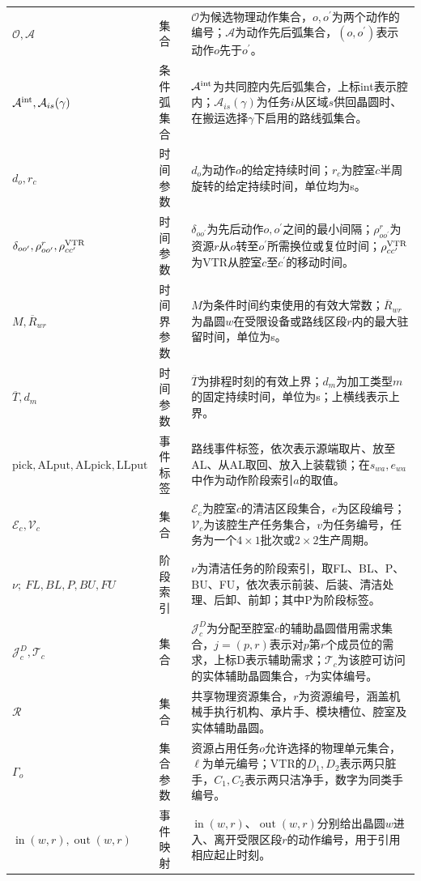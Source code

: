\documentclass[final,5p,times,twocolumn]{elsarticle}
\begin{document}
\begin{table}[t]
\begin{tabular}{C{0.23\textwidth}C{0.10\textwidth}C{0.61\textwidth}}
$\mathcal O,\mathcal A$ & 集合 & $\mathcal O$为候选物理动作集合，$o,o^{\prime}$为两个动作的编号；$\mathcal A$为动作先后弧集合，$(o,o^{\prime})$表示动作$o$先于$o^{\prime}$。\\
$\mathcal A^{\rm int},\mathcal A_{is}(\gamma)$ & 条件弧集合 & $\mathcal A^{\rm int}$为共同腔内先后弧集合，上标int表示腔内；$\mathcal A_{is}(\gamma)$为任务$i$从区域$s$供回晶圆时、在搬运选择$\gamma$下启用的路线弧集合。\\
$d_o,r_c$ & 时间参数 & $d_o$为动作$o$的给定持续时间；$r_c$为腔室$c$半周旋转的给定持续时间，单位均为s。\\
$\delta_{oo'},\rho^r_{oo'},\rho^{\rm VTR}_{cc'}$ & 时间参数 & $\delta_{oo^{\prime}}$为先后动作$o,o^{\prime}$之间的最小间隔；$\rho^r_{oo^{\prime}}$为资源$r$从$o$转至$o^{\prime}$所需换位或复位时间；$\rho^{\rm VTR}_{cc^{\prime}}$为VTR从腔室$c$至$c^{\prime}$的移动时间。\\
$M,\overline R_{wr}$ & 时间界参数 & $M$为条件时间约束使用的有效大常数；$\overline R_{wr}$为晶圆$w$在受限设备或路线区段$r$内的最大驻留时间，单位为s。\\
$\overline T,d_m$ & 时间参数 & $\overline T$为排程时刻的有效上界；$d_m$为加工类型$m$的固定持续时间，单位为s；上横线表示上界。\\
$\mathrm{pick,ALput,ALpick,LLput}$ & 事件标签 & 路线事件标签，依次表示源端取片、放至AL、从AL取回、放入上装载锁；在$s_{wa},e_{wa}$中作为动作阶段索引$a$的取值。\\
$\mathcal E_c,\mathcal V_c$ & 集合 & $\mathcal E_c$为腔室$c$的清洁区段集合，$e$为区段编号；$\mathcal V_c$为该腔生产任务集合，$v$为任务编号，任务为一个$4\times1$批次或$2\times2$生产周期。\\
$\nu;\ FL,BL,P,BU,FU$ & 阶段索引 & $\nu$为清洁任务的阶段索引，取FL、BL、P、BU、FU，依次表示前装、后装、清洁处理、后卸、前卸；其中P为阶段标签。\\
$\mathcal J_c^D,\mathcal T_c$ & 集合 & $\mathcal J_c^D$为分配至腔室$c$的辅助晶圆借用需求集合，$j=(p,r)$表示对$p$第$r$个成员位的需求，上标D表示辅助需求；$\mathcal T_c$为该腔可访问的实体辅助晶圆集合，$\tau$为实体编号。\\
$\mathcal R$ & 集合 & 共享物理资源集合，$r$为资源编号，涵盖机械手执行机构、承片手、模块槽位、腔室及实体辅助晶圆。\\
$\Gamma_o$ & 集合参数 & 资源占用任务$o$允许选择的物理单元集合，$\ell$为单元编号；VTR的$D_1,D_2$表示两只脏手，$C_1,C_2$表示两只洁净手，数字为同类手编号。\\
$\operatorname{in}(w,r),\operatorname{out}(w,r)$ & 事件映射 & $\operatorname{in}(w,r)$、$\operatorname{out}(w,r)$分别给出晶圆$w$进入、离开受限区段$r$的动作编号，用于引用相应起止时刻。\\

\end{tabular}
\end{table}
\end{document}
